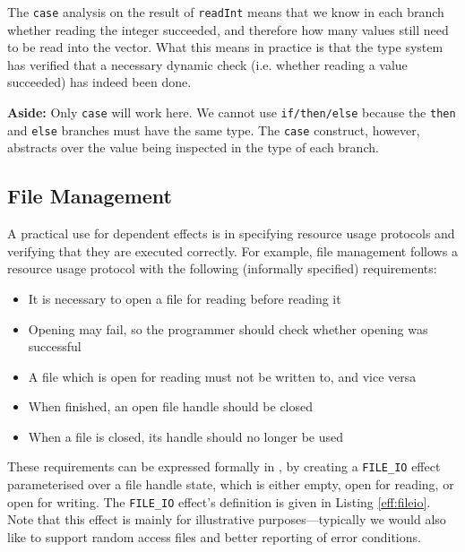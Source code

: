 \noindent
The \texttt{case} analysis on the result of \texttt{readInt} means that
we know in each branch whether reading the integer succeeded, and therefore
how many values still need to be read into the vector. What this means in
practice is that the type system has verified that a necessary dynamic
check (i.e. whether reading a value succeeded) has indeed been done.

\textbf{Aside:} Only \texttt{case} will work here. We cannot use
\texttt{if/then/else} because the \texttt{then} and \texttt{else} branches must
have the same type. The \texttt{case} construct, however,
abstracts over the value being inspected in the type of each branch.

\subsection{File Management}

A practical use for dependent effects is in specifying resource usage protocols
and verifying that they are executed correctly. For example, file management
follows a resource usage protocol with the following (informally specified)
requirements:

\begin{itemize}
\item It is necessary to open a file for reading before reading it
\item Opening may fail, so the programmer should check whether opening 
was successful
\item A file which is open for reading must not be written to, and vice versa
\item When finished, an open file handle should be closed
\item When a file is closed, its handle should no longer be used
\end{itemize}

These requirements can be expressed formally in \effects{}, by creating
a \texttt{FILE\_IO} effect parameterised over a file handle state, which
is either empty, open for reading, or open for writing. The \texttt{FILE\_IO}
effect's definition is given in Listing \ref{eff:fileio}. Note that this
effect is mainly for illustrative purposes---typically we would also like to
support random access files and better reporting of error conditions.

